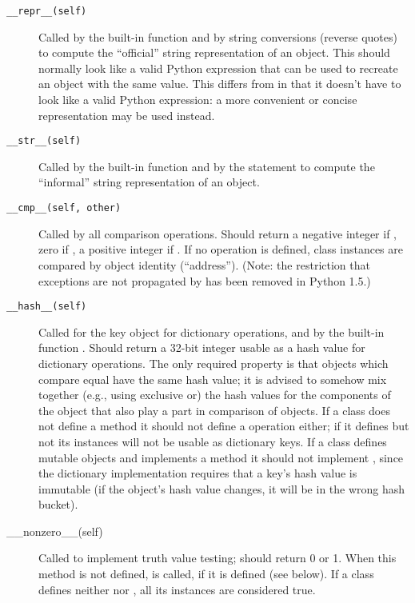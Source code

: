 \begin{description}
\item[{\tt __repr__(self)}]
Called by the  built-in function and by string conversions
(reverse quotes) to compute the ``official'' string representation of
an object.  This should normally look like a valid Python expression
that can be used to recreate an object with the same value.
This differs from  in that it doesn't have to look like
a valid Python expression: a more convenient or concise representation
may be used instead.

\item[{\tt __str__(self)}]
Called by the  built-in function and by the 
statement to compute the ``informal'' string representation of an object.

\item[{\tt __cmp__(self, other)}]
Called by all comparison operations.  Should return a negative integer if
,  zero if , a positive integer if
.  If no  operation is defined, class
instances are compared by object identity (``address'').
(Note: the restriction that exceptions are not propagated by
 has been removed in Python 1.5.)

\item[{\tt __hash__(self)}]
Called for the key object for dictionary operations,
and by the built-in function
.  Should return a 32-bit integer
usable as a hash value
for dictionary operations.  The only required property is that objects
which compare equal have the same hash value; it is advised to somehow
mix together (e.g., using exclusive or) the hash values for the
components of the object that also play a part in comparison of
objects.  If a class does not define a  method it should
not define a  operation either; if it defines
 but not  its instances will not be
usable as dictionary keys.  If a class defines mutable objects and
implements a  method it should not implement
, since the dictionary implementation requires that
a key's hash value is immutable (if the object's hash value changes, it
will be in the wrong hash bucket).

\item[__nonzero__(self)]
Called to implement truth value testing; should return 0 or 1.  When
this method is not defined,  is called, if it is defined
(see below).  If a class defines neither  nor
, all its instances are considered true.

\end{description}



